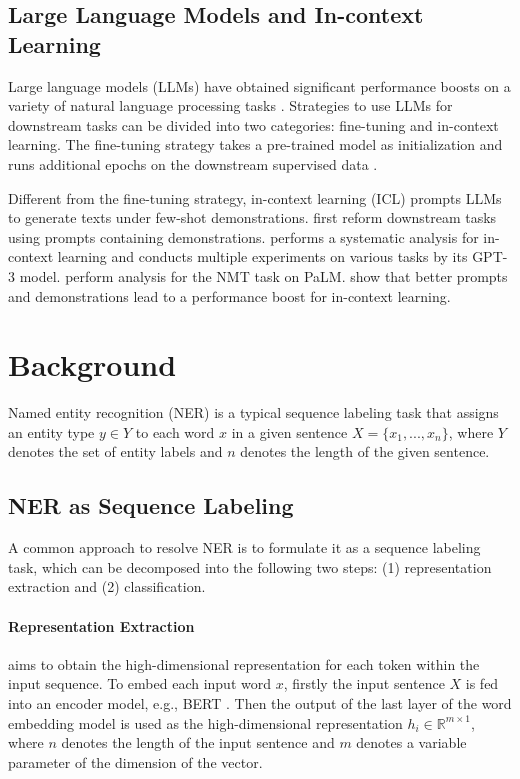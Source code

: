 \documentclass{article}
\begin{document}
\subsection{Large Language Models and In-context Learning}
Large language models (LLMs) \citep{brown2020language,rae2021scaling,smith2022using,hoffmann2022training,chowdhery2022palm} have obtained significant performance boosts on a variety of natural language processing tasks \citep{hegselmann2022tabllm,vilar2022prompting,perez2021true,pietrzak2021story,wei2021finetuned}. 
Strategies to use LLMs for downstream tasks can be divided into two categories:  
fine-tuning and in-context learning. 
The fine-tuning strategy takes a pre-trained model as initialization and runs additional epochs on the downstream supervised data \citep{raffel2020exploring,gururangan2018annotation,roberts2020much,guu2020retrieval}. 

Different from the fine-tuning strategy, 
in-context learning (ICL) prompts LLMs to generate texts under few-shot demonstrations.  
\citet{radford2019language} first reform downstream tasks using prompts containing demonstrations. 
 \citet{brown2020language} performs a systematic analysis for in-context learning and conducts multiple experiments on various tasks by its GPT-3 model. 
 \citet{chowdhery2022palm} perform analysis for the NMT task on PaLM. 
 \citet{perez2021true,lu2021fantastically,rubin2021learning} show that better prompts and demonstrations lead to a performance boost for in-context learning. 


\section{Background}
\label{background_ner}

Named entity recognition (NER) is a typical sequence labeling task that assigns an entity type $y\in Y$ to each word $x$ in a given sentence $X=\{x_{1},...,x_{n}\}$, where $Y$ denotes the set of entity labels and $n$ denotes the length of the given sentence.

\subsection{NER as Sequence Labeling}
A common approach to resolve NER is to formulate it as a sequence labeling task, which can be decomposed into the following two steps: (1) representation extraction and (2) classification.


\paragraph{Representation Extraction}
 aims to obtain the high-dimensional representation for each token within the input sequence. 
To embed each input word $x$, firstly the input sentence $X$ is fed into an encoder model, e.g., BERT \cite{devlin2018bert}. Then the output of the last layer of the word embedding model is used as the high-dimensional representation $h_{i}\in \mathbb{R}^{m \times 1}$, where $n$ denotes the length of the input sentence and $m$ denotes a variable parameter of the dimension of the vector.
\end{document}

